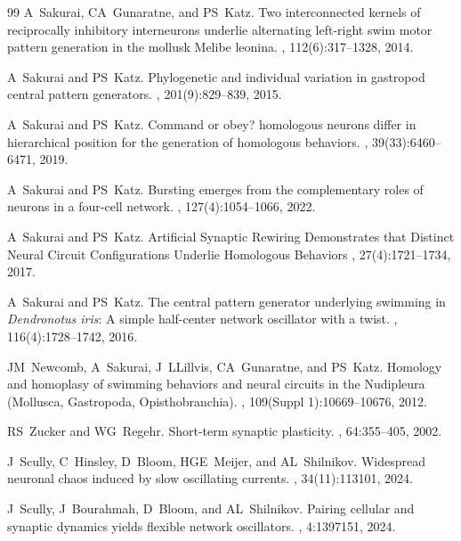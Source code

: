 \documentclass[nofootinbib,aip,amsmath,amssymb,reprint,twocolumn,10pt]{revtex4-2}
\begin{document}
\begin{thebibliography}{99}
A~Sakurai, CA~Gunaratne, and PS~Katz.
\newblock Two interconnected kernels of reciprocally inhibitory interneurons
  underlie alternating left-right swim motor pattern generation in the mollusk
  Melibe leonina.
, 112(6):317--1328, 2014.

A~Sakurai and PS~Katz.
\newblock Phylogenetic and individual variation in gastropod central pattern
  generators.
, 201(9):829--839, 2015.


A~Sakurai and PS~Katz.
\newblock Command or obey? homologous neurons differ in hierarchical position
  for the generation of homologous behaviors.
, 39(33):6460--6471, 2019.

A~Sakurai and PS~Katz.
\newblock Bursting emerges from the complementary roles of neurons in a
  four-cell network.
, 127(4):1054--1066, 2022.

A~Sakurai and PS~Katz.
\newblock Artificial Synaptic Rewiring Demonstrates that Distinct Neural Circuit Configurations
Underlie Homologous Behaviors , 27(4):1721--1734, 2017.


A~Sakurai and PS~Katz.
\newblock  The central pattern generator underlying swimming in \emph{\textit{Dendronotus iris}}: A simple half-center network oscillator with a twist.
 , 116(4):1728--1742, 2016.


JM~Newcomb, A~Sakurai, J~LLillvis, CA~Gunaratne, and PS~Katz.
\newblock Homology and homoplasy of swimming behaviors and neural circuits in the Nudipleura (Mollusca, Gastropoda, Opisthobranchia).
, 109(Suppl 1):10669--10676, 2012.

RS~Zucker and WG~Regehr.
\newblock Short-term synaptic plasticity.
, 64:355--405, 2002.

J~Scully, C~Hinsley, D~Bloom, HGE~Meijer, and AL~Shilnikov.
\newblock Widespread neuronal chaos induced by slow oscillating currents.
, 34(11):113101, 2024.

J~Scully, J~Bourahmah, D~Bloom, and AL~Shilnikov.
\newblock Pairing cellular and synaptic dynamics yields flexible network oscillators.
, 4:1397151, 2024.


\end{thebibliography}
\end{document}
